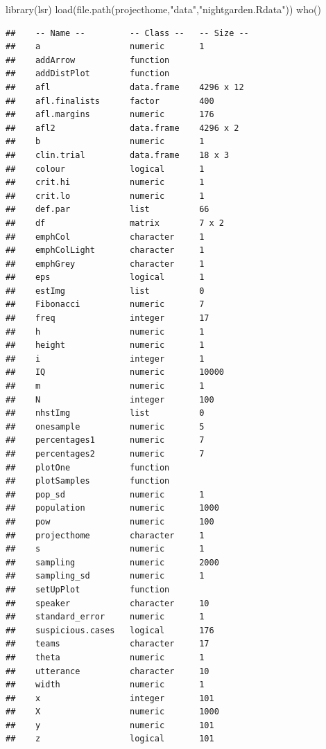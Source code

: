 \documentclass[
]{book}
\newenvironment{Shaded}{\begin{snugshade}}{\end{snugshade}}
\newcommand{\FunctionTok}[1]{\textcolor[rgb]{0.00,0.00,0.00}{#1}}
\newcommand{\NormalTok}[1]{#1}
\newcommand{\StringTok}[1]{\textcolor[rgb]{0.31,0.60,0.02}{#1}}
\begin{document}
\begin{Shaded}
\begin{Highlighting}[]
\FunctionTok{library}\NormalTok{(lsr)}
\FunctionTok{load}\NormalTok{(}\FunctionTok{file.path}\NormalTok{(projecthome,}\StringTok{"data"}\NormalTok{,}\StringTok{"nightgarden.Rdata"}\NormalTok{))}
\FunctionTok{who}\NormalTok{()}
\end{Highlighting}
\end{Shaded}

\begin{verbatim}
##    -- Name --         -- Class --   -- Size --
##    a                  numeric       1         
##    addArrow           function                
##    addDistPlot        function                
##    afl                data.frame    4296 x 12 
##    afl.finalists      factor        400       
##    afl.margins        numeric       176       
##    afl2               data.frame    4296 x 2  
##    b                  numeric       1         
##    clin.trial         data.frame    18 x 3    
##    colour             logical       1         
##    crit.hi            numeric       1         
##    crit.lo            numeric       1         
##    def.par            list          66        
##    df                 matrix        7 x 2     
##    emphCol            character     1         
##    emphColLight       character     1         
##    emphGrey           character     1         
##    eps                logical       1         
##    estImg             list          0         
##    Fibonacci          numeric       7         
##    freq               integer       17        
##    h                  numeric       1         
##    height             numeric       1         
##    i                  integer       1         
##    IQ                 numeric       10000     
##    m                  numeric       1         
##    N                  integer       100       
##    nhstImg            list          0         
##    onesample          numeric       5         
##    percentages1       numeric       7         
##    percentages2       numeric       7         
##    plotOne            function                
##    plotSamples        function                
##    pop_sd             numeric       1         
##    population         numeric       1000      
##    pow                numeric       100       
##    projecthome        character     1         
##    s                  numeric       1         
##    sampling           numeric       2000      
##    sampling_sd        numeric       1         
##    setUpPlot          function                
##    speaker            character     10        
##    standard_error     numeric       1         
##    suspicious.cases   logical       176       
##    teams              character     17        
##    theta              numeric       1         
##    utterance          character     10        
##    width              numeric       1         
##    x                  integer       101       
##    X                  numeric       1000      
##    y                  numeric       101       
##    z                  logical       101
\end{verbatim}
\end{document}
